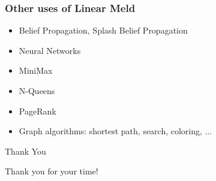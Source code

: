 \documentclass{beamer}
\begin{document}


\begin{frame}[fragile]
   \frametitle{Other uses of Linear Meld}
   \begin{itemize}
      \item Belief Propagation, Splash Belief Propagation
      \item Neural Networks
      \item MiniMax
      \item N-Queens
      \item PageRank
      \item Graph algorithms: shortest path, search, coloring, ...
   \end{itemize}
\end{frame}



\begin{frame}{Thank You}
\begin{center}
{\Huge Thank you for your time!}
\end{center}
\end{frame}
\end{document}
